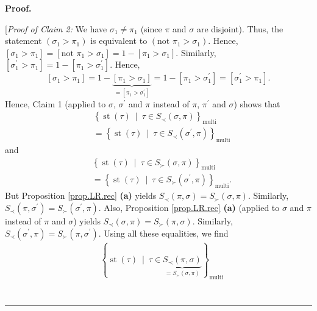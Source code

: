 \documentclass[numbers=enddot,12pt,final,onecolumn,notitlepage]{scrartcl}%
\theoremstyle{definition}
\newenvironment{statement}{\begin{quote}}{\end{quote}}
\newenvironment{proof}[1][Proof]{\noindent\textbf{#1.} }{\ \rule{0.5em}{0.5em}}
\begin{document}
\begin{proof}
\begin{statement}
\end{statement}

[\textit{Proof of Claim 2:} We have $\sigma_{1}\neq\pi_{1}$ (since $\pi$ and
$\sigma$ are disjoint). Thus, the statement $\left(  \sigma_{1}>\pi
_{1}\right)  $ is equivalent to $\left(  \text{not }\pi_{1}>\sigma_{1}\right)
$. Hence, $\left[  \sigma_{1}>\pi_{1}\right]  =\left[  \text{not }\pi
_{1}>\sigma_{1}\right]  =1-\left[  \pi_{1}>\sigma_{1}\right]  $. Similarly,
$\left[  \sigma_{1}^{\prime}>\pi_{1}\right]  =1-\left[  \pi_{1}>\sigma
_{1}^{\prime}\right]  $. Hence,%
\[
\left[  \sigma_{1}>\pi_{1}\right]  =1-\underbrace{\left[  \pi_{1}>\sigma
_{1}\right]  }_{=\left[  \pi_{1}>\sigma_{1}^{\prime}\right]  }=1-\left[
\pi_{1}>\sigma_{1}^{\prime}\right]  =\left[  \sigma_{1}^{\prime}>\pi
_{1}\right]  .
\]
Hence, Claim 1 (applied to $\sigma$, $\sigma^{\prime}$ and $\pi$ instead of
$\pi$, $\pi^{\prime}$ and $\sigma$) shows that%
\begin{align*}
&  \left\{  \operatorname*{st}\left(  \tau\right)  \ \mid\ \tau\in S_{\prec
}\left(  \sigma,\pi\right)  \right\}  _{\operatorname*{multi}}\\
&  =\left\{  \operatorname*{st}\left(  \tau\right)  \ \mid\ \tau\in S_{\prec
}\left(  \sigma^{\prime},\pi\right)  \right\}  _{\operatorname*{multi}}%
\end{align*}
and%
\begin{align*}
&  \left\{  \operatorname*{st}\left(  \tau\right)  \ \mid\ \tau\in S_{\succ
}\left(  \sigma,\pi\right)  \right\}  _{\operatorname*{multi}}\\
&  =\left\{  \operatorname*{st}\left(  \tau\right)  \ \mid\ \tau\in S_{\succ
}\left(  \sigma^{\prime},\pi\right)  \right\}  _{\operatorname*{multi}}.
\end{align*}
But Proposition \ref{prop.LR.rec} \textbf{(a)} yields $S_{\prec}\left(
\pi,\sigma\right)  =S_{\succ}\left(  \sigma,\pi\right)  $. Similarly,
$S_{\prec}\left(  \pi,\sigma^{\prime}\right)  =S_{\succ}\left(  \sigma
^{\prime},\pi\right)  $. Also, Proposition \ref{prop.LR.rec} \textbf{(a)}
(applied to $\sigma$ and $\pi$ instead of $\pi$ and $\sigma$) yields
$S_{\prec}\left(  \sigma,\pi\right)  =S_{\succ}\left(  \pi,\sigma\right)  $.
Similarly, $S_{\prec}\left(  \sigma^{\prime},\pi\right)  =S_{\succ}\left(
\pi,\sigma^{\prime}\right)  $. Using all these equalities, we find%
\begin{align*}
&  \left\{  \operatorname*{st}\left(  \tau\right)  \ \mid\ \tau\in
\underbrace{S_{\prec}\left(  \pi,\sigma\right)  }_{=S_{\succ}\left(
\sigma,\pi\right)  }\right\}  _{\operatorname*{multi}}\\

\end{align*}
\end{proof}
\end{document}
